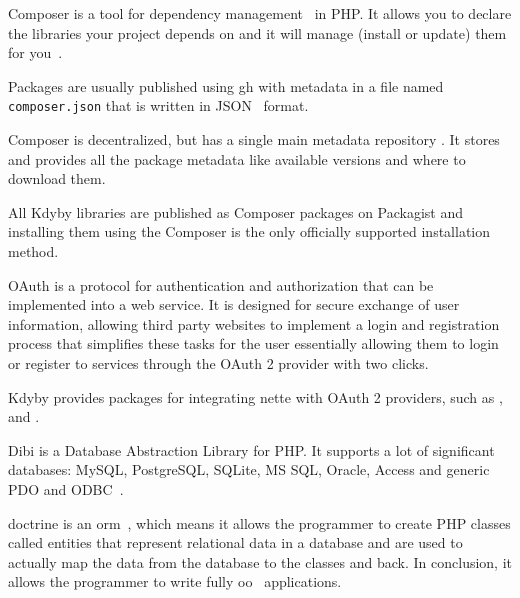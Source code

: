  \label{sec:theory:composer}

Composer is a tool for dependency management~\cite{wiki:package-manager} in PHP. It allows you to declare the libraries your project depends on and it will manage (install or update) them for you~\cite{composer:docs:intro}.

Packages are usually published using \gls{gh} with metadata in a file named \lstinline{composer.json} that is written in JSON~\cite{wiki:json} format.

Composer is decentralized, but has a single main metadata repository . It stores and provides all the package metadata like available versions and where to download them.

All Kdyby libraries are published as Composer packages on Packagist and installing them using the Composer is the only officially supported installation method.

 \label{sec:theory:oauth2}

OAuth is a protocol for authentication and authorization that can be implemented into a web service. It is designed for secure exchange of user information, allowing third party websites to implement a login and registration process that simplifies these tasks for the user essentially allowing them to login or register to services through the OAuth 2 provider with two clicks.

Kdyby provides packages for integrating \gls{nette} with OAuth 2 providers, such as ,  and .

 \label{sec:theory:dibi}

Dibi is a Database Abstraction Library for PHP. It supports a lot of significant databases: MySQL, PostgreSQL, SQLite, MS SQL, Oracle, Access and generic PDO and ODBC~\cite{dibi:homepage}.

 \label{sec:theory:doctrine}

\gls{doctrine} is an \gls{orm}~\cite{wiki:orm}, which means it allows the programmer to create PHP classes called entities that represent relational data in a database and are used to actually map the data from the database to the classes and back. In conclusion, it allows the programmer to write fully \gls{oo}~\cite{wiki:oop} applications.

